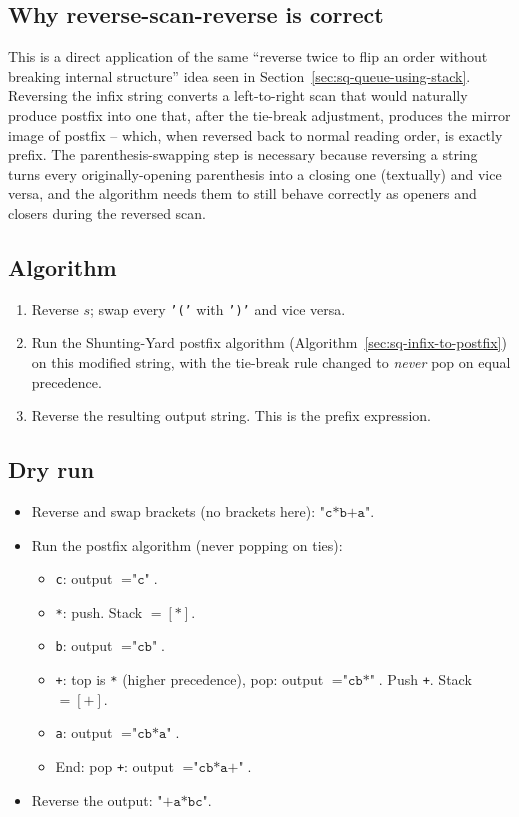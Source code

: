 \subsection*{Why reverse-scan-reverse is correct}

This is a direct application of the same ``reverse twice to flip an order
without breaking internal structure'' idea seen in
Section~\ref{sec:sq-queue-using-stack}. Reversing the infix string
converts a left-to-right scan that would naturally produce postfix into
one that, after the tie-break adjustment, produces the mirror image of
postfix -- which, when reversed back to normal reading order, is exactly
prefix. The parenthesis-swapping step is necessary because reversing a
string turns every originally-opening parenthesis into a closing one
(textually) and vice versa, and the algorithm needs them to still behave
correctly as openers and closers during the reversed scan.

\subsection*{Algorithm}

\begin{enumerate}
  \item Reverse $s$; swap every \texttt{'('} with \texttt{')'} and vice
        versa.
  \item Run the Shunting-Yard postfix algorithm
        (Algorithm~\ref{sec:sq-infix-to-postfix}) on this modified
        string, with the tie-break rule changed to \emph{never} pop on
        equal precedence.
  \item Reverse the resulting output string. This is the prefix
        expression.
\end{enumerate}

\subsection*{Dry run}


\begin{itemize}
  \item Reverse and swap brackets (no brackets here): $\texttt{"c*b+a"}$.
  \item Run the postfix algorithm (never popping on ties):
  \begin{itemize}
    \item \texttt{c}: output $=\texttt{"c"}$.
    \item \texttt{*}: push. Stack $=[*]$.
    \item \texttt{b}: output $=\texttt{"cb"}$.
    \item \texttt{+}: top is \texttt{*} (higher precedence), pop:
          output $=\texttt{"cb*"}$. Push \texttt{+}. Stack $=[+]$.
    \item \texttt{a}: output $=\texttt{"cb*a"}$.
    \item End: pop \texttt{+}: output $=\texttt{"cb*a+"}$.
  \end{itemize}
  \item Reverse the output: $\texttt{"+a*bc"}$.
\end{itemize}

